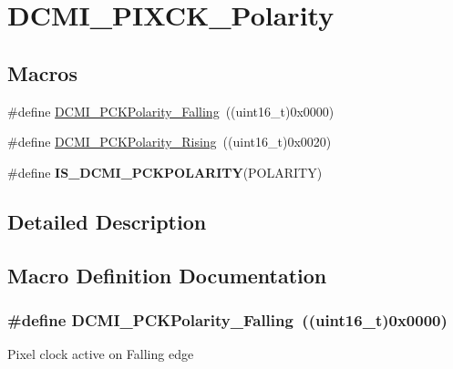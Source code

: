 \hypertarget{group___d_c_m_i___p_i_x_c_k___polarity}{}\section{D\+C\+M\+I\+\_\+\+P\+I\+X\+C\+K\+\_\+\+Polarity}
\label{group___d_c_m_i___p_i_x_c_k___polarity}
\subsection*{Macros}
\begin{DoxyCompactItemize}
\item 
\#define \hyperlink{group___d_c_m_i___p_i_x_c_k___polarity_ga71fe5ad550cc63a754ea075d7b21fd78}{D\+C\+M\+I\+\_\+\+P\+C\+K\+Polarity\+\_\+\+Falling}~((uint16\+\_\+t)0x0000)
\item 
\#define \hyperlink{group___d_c_m_i___p_i_x_c_k___polarity_ga3835956f9c552c1a0438ee408d5046ca}{D\+C\+M\+I\+\_\+\+P\+C\+K\+Polarity\+\_\+\+Rising}~((uint16\+\_\+t)0x0020)
\item 
\#define {\bfseries I\+S\+\_\+\+D\+C\+M\+I\+\_\+\+P\+C\+K\+P\+O\+L\+A\+R\+I\+T\+Y}(P\+O\+L\+A\+R\+I\+T\+Y)
\end{DoxyCompactItemize}


\subsection{Detailed Description}


\subsection{Macro Definition Documentation}
\hypertarget{group___d_c_m_i___p_i_x_c_k___polarity_ga71fe5ad550cc63a754ea075d7b21fd78}{}
\subsubsection[{D\+C\+M\+I\+\_\+\+P\+C\+K\+Polarity\+\_\+\+Falling}]{\setlength{\rightskip}{0pt plus 5cm}\#define D\+C\+M\+I\+\_\+\+P\+C\+K\+Polarity\+\_\+\+Falling~((uint16\+\_\+t)0x0000)}\label{group___d_c_m_i___p_i_x_c_k___polarity_ga71fe5ad550cc63a754ea075d7b21fd78}
Pixel clock active on Falling edge \hypertarget{group___d_c_m_i___p_i_x_c_k___polarity_ga3835956f9c552c1a0438ee408d5046ca}{}
